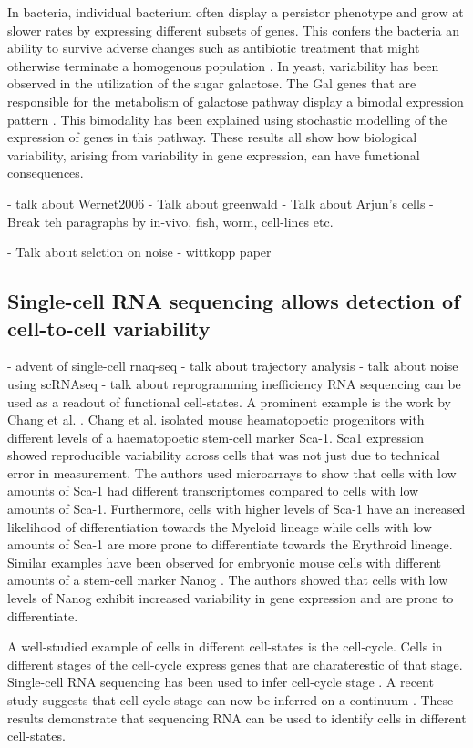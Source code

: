 In bacteria, individual bacterium often display a persistor phenotype and grow at slower rates by expressing different subsets of genes. This confers the bacteria an ability to survive adverse changes such as antibiotic treatment that might otherwise terminate a homogenous population \cite{veening_bet-hedging_2008}. In yeast, variability has been observed in the utilization of the sugar galactose. The Gal genes that are responsible for the metabolism of galactose pathway display a bimodal expression pattern \cite{acar_enhancement_2005}. This bimodality has been explained using stochastic modelling of the expression of genes in this pathway. These results all show how biological variability, arising from variability in gene expression, can have functional consequences. 

- talk about Wernet2006
- Talk about greenwald
- Talk about Arjun's cells
- Break teh paragraphs by in-vivo, fish, worm, cell-lines etc.

- Talk about selction on noise
- wittkopp paper

\subsection{Single-cell RNA sequencing allows detection of cell-to-cell variability }

- advent of single-cell rnaq-seq
- talk about trajectory analysis
- talk about noise using scRNAseq
- talk about reprogramming inefficiency
RNA sequencing can be used as a readout of functional cell-states. A prominent example is the work by Chang et al.  \cite{chang_transcriptome-wide_2008}. Chang et al. isolated mouse heamatopoetic progenitors with different levels of a haematopoetic stem-cell marker Sca-1.  Sca1 expression showed reproducible variability across cells that was not just due to technical error in measurement. The authors used microarrays to show that cells with low amounts of Sca-1 had different transcriptomes compared to cells with low amounts of Sca-1. Furthermore, cells with higher levels of Sca-1 have an increased likelihood of differentiation towards the Myeloid lineage while cells with low amounts of Sca-1 are more prone to differentiate towards the Erythroid lineage. Similar examples have been observed for embryonic mouse cells with different amounts of a stem-cell marker Nanog \cite{kalmar_regulated_2009}. The authors showed that cells with low levels of Nanog exhibit increased variability in gene expression and are prone to differentiate.

A well-studied example of cells in different cell-states is the cell-cycle. Cells in different stages of the cell-cycle express genes that are charaterestic of that stage. Single-cell RNA sequencing has been used to infer cell-cycle stage \cite{buettner_computational_2015,leng_oscope_2015}. A recent study suggests that cell-cycle stage can now be inferred on a continuum  \cite{hsiao_characterizing_2019}. These results demonstrate that sequencing RNA can be used to identify cells in different cell-states.  \cite{trapnell_defining_2015,shaffer_memory_2018,sharma_chromatin-mediated_2010}


